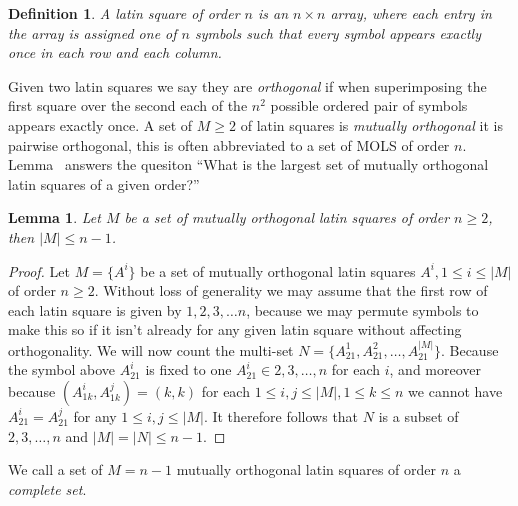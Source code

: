 \documentclass{article}
\newtheorem{lemma}{Lemma}
\newtheorem{definition}{Definition}
\begin{document}
\begin{definition}
  A latin square of order \(n\) is an \(n \times n\) array, where each entry in the array is assigned one of \(n\) symbols such that every symbol appears exactly once in each row and each column.
\end{definition}

Given two latin squares we say they are \textit{orthogonal} if when superimposing the first square over the second each of the \(n^2\) possible ordered pair of symbols appears exactly once.
A set of \(M \geq 2\) of latin squares is \textit{mutually orthogonal} it is pairwise orthogonal, this is often abbreviated to a set of MOLS of order \(n\). Lemma~\label{mols-bound} answers the quesiton ``What is the largest set of mutually orthogonal latin squares of a given order?''

\begin{lemma}\label{lemma:mols-bound}
  Let \(M\) be a set of mutually orthogonal latin squares of order \(n \geq 2\), then \(|M| \leq n - 1\).
\end{lemma}
\begin{proof}
  Let \(M = \{A^i\}\) be a set of mutually orthogonal latin squares \(A^i, 1 \leq i \leq |M|\) of order \(n \geq 2\). Without loss of generality we may assume that the first row of each latin square is given by \(1, 2, 3, \ldots n\), because we may permute symbols to make this so if it isn't already for any given latin square without affecting orthogonality.
  We will now count the multi-set \(N = \{A^1_{21}, A^2_{21}, \ldots, A^{|M|}_{21}\}\). Because the symbol above \(A^i_{21}\) is fixed to one \(A^i_{21} \in {2, 3, \ldots, n}\) for each \(i\), and moreover because \((A^i_{1k}, A^j_{1k}) = (k, k)\) for each \(1 \leq i, j \leq |M|, 1 \leq k \leq n\) we cannot have \(A^i_{21} = A^j_{21}\) for any \(1 \leq i, j \leq |M|\).
  It therefore follows that \(N\) is a subset of \({2, 3, \ldots, n}\) and \(|M| = |N| \leq n - 1\).
\end{proof}

We call a set of \(M = n - 1\) mutually orthogonal latin squares of order \(n\) a \textit{complete set}.
\end{document}

